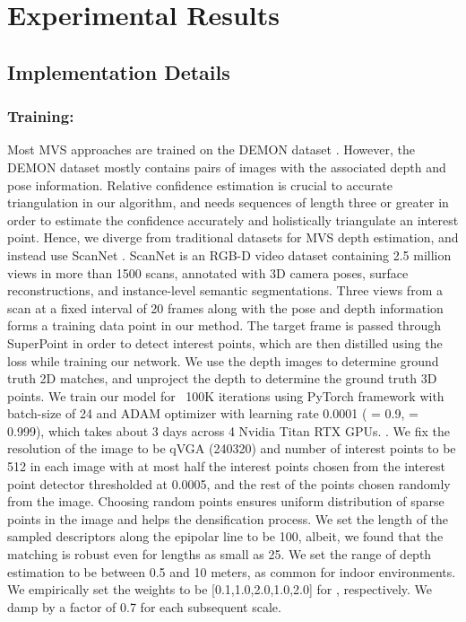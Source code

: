 \documentclass[runningheads]{llncs}
\begin{document}
\section{Experimental Results}

\subsection{Implementation Details}

\subsubsection{Training:} Most MVS approaches are trained on the DEMON dataset \cite{ummenhofer2017demon}. However, the DEMON dataset mostly contains pairs of images with the associated depth and pose information. Relative confidence estimation is crucial to accurate triangulation in our algorithm, and needs sequences of length three or greater in order to estimate the confidence accurately and holistically triangulate an interest point. Hence, we diverge from traditional datasets for MVS depth estimation, and instead use ScanNet \cite{dai2017scannet}. ScanNet is an RGB-D video dataset containing 2.5 million views in more than 1500 scans, annotated with 3D camera poses, surface reconstructions, and instance-level semantic segmentations. Three views from a scan at a fixed interval of 20 frames along with the pose and depth information forms a training data point in our method. The target frame is passed through SuperPoint in order to detect interest points, which are then distilled using the loss  while training our network. We use the depth images to determine ground truth 2D matches, and unproject the depth to determine the ground truth 3D points. We train our model for ~100K iterations using PyTorch framework with batch-size of 24 and ADAM optimizer with learning rate 0.0001 ( = 0.9,  = 0.999), which takes about 3 days across 4 Nvidia Titan RTX GPUs. . We fix the resolution of the image to be qVGA (240320) and number of interest points to be 512 in each image with at most half the interest points chosen from the interest point detector thresholded at 0.0005, and the rest of the points chosen randomly from the image. Choosing random points ensures uniform distribution of sparse points in the image and helps the densification process. We set the length of the sampled descriptors along the epipolar line to be 100, albeit, we found that the matching is robust even for lengths as small as 25. We set the range of depth estimation to be between 0.5 and 10 meters, as common for indoor environments. We empirically set the weights to be [0.1,1.0,2.0,1.0,2.0] for , respectively. We damp  by a factor of 0.7 for each subsequent scale. 
\end{document}
